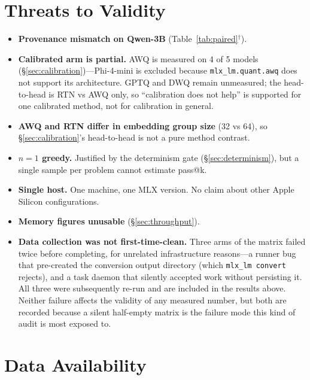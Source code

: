 \documentclass[11pt]{article}
\begin{document}
\section{Threats to Validity}
\label{sec:threats}

\begin{itemize}
  \item \textbf{Provenance mismatch on Qwen-3B} (Table~\ref{tab:paired}$^\dagger$).
  \item \textbf{Calibrated arm is partial.} AWQ is measured on 4 of 5 models
    (\S\ref{sec:calibration})---Phi-4-mini is excluded because
    \texttt{mlx\_lm.quant.awq} does not support its architecture. GPTQ and DWQ remain
    unmeasured; the head-to-head is RTN vs AWQ only, so ``calibration does not help'' is
    supported for one calibrated method, not for calibration in general.
  \item \textbf{AWQ and RTN differ in embedding group size} (32 vs 64), so
    \S\ref{sec:calibration}'s head-to-head is not a pure method contrast.
  \item \textbf{$n=1$ greedy.} Justified by the determinism gate
    (\S\ref{sec:determinism}), but a single sample per problem cannot estimate pass@k.
  \item \textbf{Single host.} One machine, one MLX version. No claim about other Apple
    Silicon configurations.
  \item \textbf{Memory figures unusable} (\S\ref{sec:throughput}).
  \item \textbf{Data collection was not first-time-clean.} Three arms of the matrix
    failed twice before completing, for unrelated infrastructure reasons---a runner bug
    that pre-created the conversion output directory (which \texttt{mlx\_lm convert}
    rejects), and a task daemon that silently accepted work without persisting it. All
    three were subsequently re-run and are included in the results above. Neither failure
    affects the validity of any measured number, but both are recorded because a silent
    half-empty matrix is the failure mode this kind of audit is most exposed to.
\end{itemize}

\section*{Data Availability}
\end{document}
